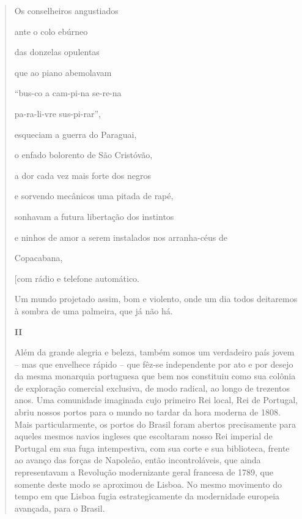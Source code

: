 \begin{quote}
Os conselheiros angustiados

ante o colo ebúrneo

das donzelas opulentas

que ao piano abemolavam

``bus-co a cam-pi-na se-re-na

pa-ra-li-vre sus-pi-rar'',

esqueciam a guerra do Paraguai,

o enfado bolorento de São Cristóvão,

a dor cada vez mais forte dos negros

e sorvendo mecânicos uma pitada de rapé,

sonhavam a futura libertação dos instintos

e ninhos de amor a serem instalados nos arranha-céus de

Copacabana,

{[}com rádio e telefone automático.

Um mundo projetado assim, bom e violento, onde um dia todos deitaremos à
sombra de uma palmeira, que já não há.

\textbf{II}

Além da grande alegria e beleza, também somos um verdadeiro país jovem
-- mas que envelhece rápido -- que fêz-se independente por ato e por
desejo da mesma monarquia portuguesa que bem nos constituiu como sua
colônia de exploração comercial exclusiva, de modo radical, ao longo de
trezentos anos. Uma comunidade imaginada cujo primeiro Rei local, Rei de
Portugal, abriu nossos portos para o mundo no tardar da hora moderna de
1808. Mais particularmente, os portos do Brasil foram abertos
precisamente para aqueles mesmos navios ingleses que escoltaram nosso
Rei imperial de Portugal em sua fuga intempestiva, com sua corte e sua
biblioteca, frente ao avanço das forças de Napoleão, então
incontroláveis, que ainda representavam a Revolução modernizante geral
francesa de 1789, que somente deste modo se aproximou de Lisboa. No
mesmo movimento do tempo em que Lisboa fugia estrategicamente da
modernidade europeia avançada, para o Brasil.


\end{quote}
